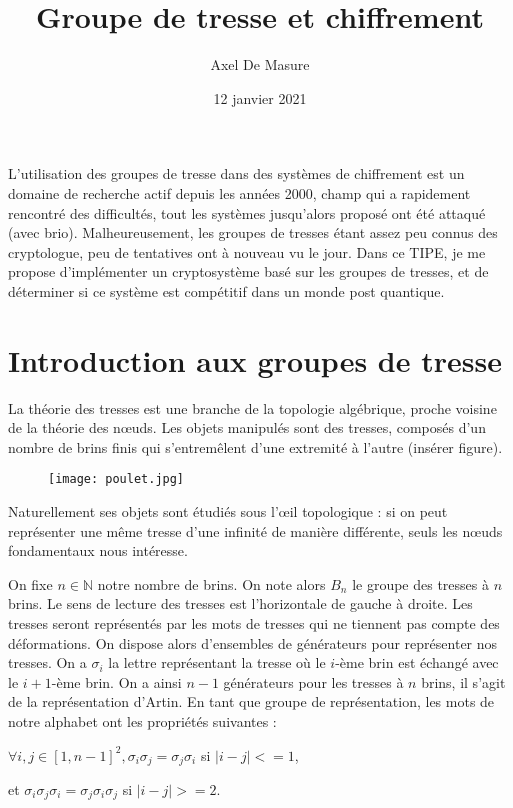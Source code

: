\documentclass[a4paper, 100pt]{article}
\begin{document}
\title{\textbf{Groupe de tresse et chiffrement}}
\author{Axel De Masure}
\date{12 janvier 2021}
\maketitle
\graphicspath{ {./} }

L'utilisation des groupes de tresse dans des systèmes de chiffrement est un domaine de recherche actif depuis les années 2000, champ qui a rapidement rencontré des difficultés, tout les systèmes jusqu'alors proposé ont été attaqué (avec brio). Malheureusement, les groupes de tresses étant assez peu connus des cryptologue, peu de tentatives ont à nouveau vu le jour. Dans ce TIPE, je me propose d'implémenter un cryptosystème basé sur les groupes de tresses, et de déterminer si ce système est compétitif dans un monde post quantique.

\section{Introduction aux groupes de tresse}
La théorie des tresses est une branche de la topologie algébrique, proche voisine de la théorie des nœuds. Les objets manipulés sont des tresses, composés d'un nombre de brins finis qui s'entremêlent d'une extremité à l'autre (insérer figure).
\begin{figure}
\texttt{[image: poulet.jpg]}
\end{figure}


Naturellement ses objets sont étudiés sous l'œil topologique : si on peut représenter une même tresse d'une infinité de manière différente, seuls les nœuds fondamentaux nous intéresse.

On fixe $ n \in \mathbb{N} $ notre nombre de brins. On note alors $B_n$ le groupe des tresses à $n$ brins. Le sens de lecture des tresses est l'horizontale de gauche à droite. Les tresses seront représentés par les mots de tresses qui ne tiennent pas compte des déformations. On dispose alors d'ensembles de générateurs pour représenter nos tresses. On a $\sigma_i$ la lettre représentant la tresse où le $i$-ème brin est échangé avec le $i+1$-ème brin. On a ainsi $n-1$ générateurs pour les tresses à $n$ brins, il s'agit de la représentation d'Artin.
En tant que groupe de représentation, les mots de notre alphabet ont les propriétés suivantes :

$\forall i,j \in [1,n-1]^2, \sigma_i\sigma_j = \sigma_j\sigma_i$ si $|i-j| <= 1$,

et $\sigma_i\sigma_j\sigma_i = \sigma_j\sigma_i\sigma_j$ si $|i-j| >= 2$. 
\end{document}

